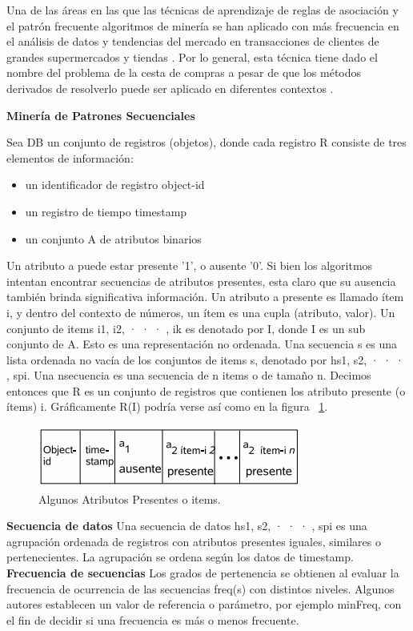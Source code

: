 Una de las áreas en las que las técnicas de aprendizaje de reglas de asociación y el patrón frecuente 
algoritmos de minería se han aplicado con más frecuencia en el análisis de datos y tendencias del
mercado en transacciones de clientes de grandes supermercados y tiendas \cite{agrawal1994fast}. Por lo general, esta técnica 
tiene dado el nombre del problema de la cesta de compras a pesar de que los métodos derivados de resolverlo
puede ser aplicado en diferentes contextos \cite{han2006data}.

\textbf{Minería de Patrones Secuenciales}

Sea DB un conjunto de registros (objetos), donde cada registro R consiste de tres
elementos de información:
\begin{itemize}
\item un identificador de registro object-id
\item un registro de tiempo timestamp
\item un conjunto A de atributos binarios
\end{itemize}
Un atributo a puede estar presente ’1’, o ausente ’0’. Si bien los algoritmos intentan encontrar secuencias de atributos
presentes, esta claro que su ausencia también brinda significativa información. Un atributo a presente es llamado
ítem i, y dentro del contexto de números, un ítem es una cupla (atributo, valor). Un conjunto de items
{i1, i2, · · · , ik} es denotado por I, donde I es un sub conjunto de A. Esto es una representación no ordenada. Una
secuencia s es una lista ordenada no vacía de los conjuntos de items s, denotado por hs1, s2, · · · , spi. Una nsecuencia
es una secuencia de n items o de tamaño n. Decimos entonces que R es un conjunto de registros que
contienen los atributo presente (o ítems) i. Gráficamente R(I) podría verse así como en la figura ~\ref{fig:atrib}.

\begin{figure}[htb]
 \centering 
 \includegraphics[scale=0.5]{pictures/atrib.png}
 \caption{Algunos Atributos Presentes o items.} 
 \label{fig:atrib}
\end{figure}

\textbf{Secuencia de datos} Una secuencia de datos hs1, s2, · · · , spi es una agrupación
ordenada de registros con atributos presentes iguales, similares o pertenecientes. La agrupación se ordena según los
datos de timestamp. \\
\textbf{Frecuencia de secuencias} Los grados de pertenencia se obtienen al evaluar la frecuencia
de ocurrencia de las secuencias freq(s) con distintos niveles. Algunos autores establecen un valor
de referencia o parámetro, por ejemplo minFreq, con el fin de decidir si una frecuencia es más o menos frecuente.\\

